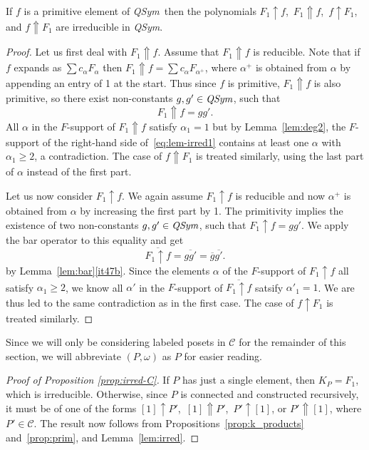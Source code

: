 \documentclass[ALCO,Unicode,published]{cedram}
\newcommand{\qsym}{{\it{QSym}}}
\newcommand{\om}{\omega}
\newcommand{\inv}[1]{\overline{#1}}
\newcommand{\Cb}{\mathcal{C}}
\newcommand{\wP}{\uparrow}
\newcommand{\sP}{\Uparrow}
\begin{document}
\begin{lemma}\label{lem:irred}
If $f$ is a primitive element of \qsym\  then the polynomials
$F_1\wP f$,\ $F_1\sP f$,\ $f\wP F_1$, and $f\sP F_1$
are irreducible in \qsym.
\end{lemma}
\begin{proof}
Let us first deal with $F_1\sP f$.
Assume that $F_1\sP f$ is reducible. 
Note that if $f$ expands as $\sum c_\alpha F_\alpha$ then $F_1\sP f = \sum c_\alpha F_{\alpha^+}$, where $\alpha^+$ is obtained from $\alpha$ by appending an entry of 1 at the start.  Thus since $f$ is primitive, $F_1\sP f$ is also primitive, so there exist non-constants $g,g'\in \qsym$, such that 
\begin{equation}\label{eq:lem-irred1}
F_1\sP f = g g'.
\end{equation}
All $\alpha$ in the $F$-support of $F_1\sP f$ satisfy $\alpha_1=1$ but by Lemma~\ref{lem:deg2}, the $F$-support of the right-hand side of~\eqref{eq:lem-irred1} contains at least one $\alpha$ with $\alpha_1 \geq 2$, a contradiction.  The case of  $f\sP F_1$ is treated similarly, using the last part of $\alpha$ instead of the first part.

Let us now consider $F_1\wP f$.
We again assume $F_1\wP f$ is reducible and now $\alpha^+$ is obtained from $\alpha$ by increasing the first part by 1.  The primitivity 
implies the existence of two non-constants $g,g'\in \qsym$, 
such that $F_1\wP f = g g'$. We apply the bar operator to this equality
and get 
\[
\inv{F_1\wP f} = \inv{g g'} = \inv{g} \inv{g'}.
\]
by Lemma~\ref{lem:bar}\ref{it47b}. Since the elements $\alpha$ of the $F$-support of $F_1\wP f$ all satisfy $\alpha_1\ge 2$, we know all $\alpha'$ in the $F$-support of 
$\inv{F_1\wP f}$ satsify $\alpha'_1 = 1$.
We are thus led to the same contradiction as in the first case. 
The case of  $f\wP F_1$ is treated similarly.
\end{proof}

Since we will only be considering labeled posets in $\Cb$ for the remainder of this section, we will abbreviate $(P,\om)$ as $P$ for easier reading.

\begin{proof}[Proof of Proposition \ref{prop:irred-C}]
If $P$ has just a single element, then $K_P = F_1$, which is irreducible.  Otherwise, since $P$ is connected and constructed recursively, it must be of one of the forms $[1]\wP P'$,\ $[1]\sP P'$,\ 
$P'\wP [1]$, or $P'\sP [1]$, where $P' \in \Cb$.  The result now follows from Propositions~\ref{prop:k_products} and~\ref{prop:prim}, and Lemma~\ref{lem:irred}.
\end{proof}
\end{document}
